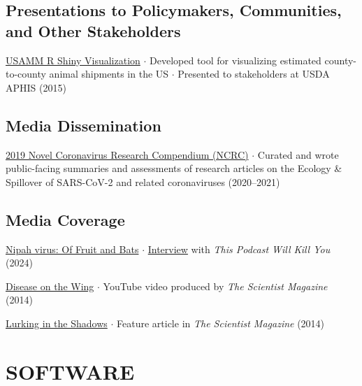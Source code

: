 \documentclass{cv}
\begin{document}

\subsection*{Presentations to Policymakers, Communities, and Other Stakeholders}

\href{https://usamm-gen-net.shinyapps.io/usamm-gen-net/}{USAMM R Shiny Visualization} $\cdot$ Developed tool for visualizing estimated county-to-county animal shipments in the US $\cdot$ Presented to stakeholders at USDA APHIS (2015)

\subsection*{Media Dissemination}

\href{https://ncrc.jhsph.edu/}{2019 Novel Coronavirus Research Compendium (NCRC)} $\cdot$ Curated and wrote public-facing summaries and assessments of research articles on the Ecology \& Spillover of SARS-CoV-2 and related coronaviruses (2020--2021)

\subsection*{Media Coverage}

\href{https://thispodcastwillkillyou.com/2024/05/21/episode-140-nipah-virus-of-fruit-and-bats/}{Nipah virus: Of Fruit and Bats} $\cdot$ \href{https://open.spotify.com/episode/3bF2bICaa7Ipq7s6EzCUKj?si=456f659ff8874de5}{Interview} with \textit{This Podcast Will Kill You} (2024)

\href{https://youtu.be/p6I0kRVGyo4}{Disease on the Wing} $\cdot$ YouTube video produced by \textit{The Scientist Magazine} (2014)

\href{https://www.the-scientist.com/features/lurking-in-the-shadows-36302}{Lurking in the Shadows} $\cdot$ Feature article in \textit{The Scientist Magazine} (2014)


\section*{SOFTWARE}
\end{document}
